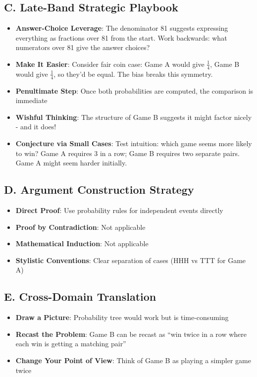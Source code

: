 \documentclass[]{article}
\begin{document}
\begin{strategicbox}
\subsection*{C. Late-Band Strategic Playbook}
\begin{itemize}[leftmargin=*]
    \item \textbf{Answer-Choice Leverage}: The denominator 81 suggests expressing everything as fractions over 81 from the start. Work backwards: what numerators over 81 give the answer choices?
    \item \textbf{Make It Easier}: Consider fair coin case: Game A would give $\frac{1}{4}$, Game B would give $\frac{1}{4}$, so they'd be equal. The bias breaks this symmetry.
    \item \textbf{Penultimate Step}: Once both probabilities are computed, the comparison is immediate
    \item \textbf{Wishful Thinking}: The structure of Game B suggests it might factor nicely - and it does!
    \item \textbf{Conjecture via Small Cases}: Test intuition: which game seems more likely to win? Game A requires 3 in a row; Game B requires two separate pairs. Game A might seem harder initially.
\end{itemize}

\subsection*{D. Argument Construction Strategy}
\begin{itemize}[leftmargin=*]
    \item \textbf{Direct Proof}: Use probability rules for independent events directly
    \item \textbf{Proof by Contradiction}: Not applicable
    \item \textbf{Mathematical Induction}: Not applicable
    \item \textbf{Stylistic Conventions}: Clear separation of cases (HHH vs TTT for Game A)
\end{itemize}

\subsection*{E. Cross-Domain Translation}
\begin{itemize}[leftmargin=*]
    \item \textbf{Draw a Picture}: Probability tree would work but is time-consuming
    \item \textbf{Recast the Problem}: Game B can be recast as ``win twice in a row where each win is getting a matching pair''
    \item \textbf{Change Your Point of View}: Think of Game B as playing a simpler game twice
\end{itemize}
\end{strategicbox}
\end{document}
